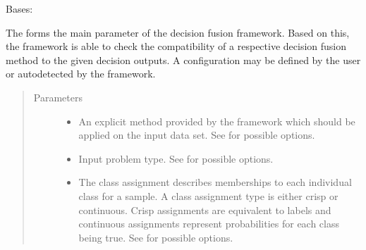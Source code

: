 \documentclass[letterpaper,10pt,english]{sphinxmanual}
\begin{document}
\begin{fulllineitems}
\label{\detokenize{pusion.model.configuration:pusion.model.configuration.Configuration}}
\sphinxAtStartPar
Bases: 

\sphinxAtStartPar
The {\hyperref[\detokenize{pusion.model.configuration:pusion.model.configuration.Configuration}]{}} forms the main parameter of the decision fusion framework. Based on this, the framework
is able to check the compatibility of a respective decision fusion method to the given decision outputs.
A configuration may be defined by the user or auto\sphinxhyphen{}detected by the framework.
\begin{quote}\begin{description}
\item[{Parameters}] \leavevmode\begin{itemize}
\item {} 
\sphinxAtStartPar
{} \textendash{} An explicit method provided by the framework which should be applied on the input data set.
See  for possible options.

\item {} 
\sphinxAtStartPar
{} \textendash{} Input problem type. See  for possible options.

\item {} 
\sphinxAtStartPar
{} \textendash{} The class assignment describes memberships to each individual class for a sample.
A class assignment type is either crisp or continuous. Crisp assignments are equivalent to labels and
continuous assignments represent probabilities for each class being true.
See  for possible options.


\end{itemize}
\end{description}
\end{quote}
\end{fulllineitems}
\end{document}

